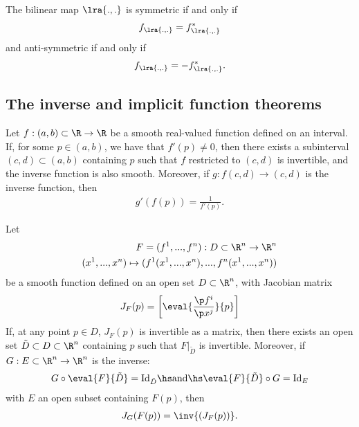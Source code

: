 \documentclass{article}
\begin{document}
\begin{lemma}
    The bilinear map $\lra{.,.}$ is symmetric if and only if
    \begin{align*}
        f_{\lra{.,.}}=f_{\lra{.,.}}^*
    \end{align*}
    and anti-symmetric if and only if
    \begin{align*}
        f_{\lra{.,.}}=-f_{\lra{.,.}}^*.
    \end{align*}
\end{lemma}


\subsection{The inverse and implicit function theorems}

\begin{theorem}
    Let $f:(a,b)\subset \R \to \R$ be a smooth real-valued function defined on an
    interval. If, for some $p\in(a,b)$, we have that $f'(p)\not=0$, then there exists
    a subinterval $(c,d)\subset(a,b)$ containing $p$ such that $f$ restricted to $(c,d)$
    is invertible, and the inverse function is also smooth. Moreover, if
    $g:f(c,d)\to(c,d)$ is the inverse function, then
    \begin{align*}
        g'(f(p))=\frac{1}{f'(p)}.
    \end{align*}
\end{theorem}

\begin{theorem}
    Let
    \begin{align*}
        F = (f^1,...,f^n):D\subset \R^n\to\R^n \\
        (x^1,...,x^n)\mapsto (f^1(x^1,...,x^n), ..., f^n(x^1,...,x^n))
    \end{align*}
    be a smooth function defined on an open set $D\subset\R^n$, with Jacobian matrix
    \begin{align*}
        J_F(p)=\left[\eval{\frac{\p f^i}{\p x^j}}{p}\right]
    \end{align*}
    If, at any point $p\in D$, $J_F(p)$ is invertible as a matrix, then there exists
    an open set $\tilde D\subset D\subset \R^n$ containing $p$ such that $F|_{\tilde D}$
    is invertible.
    Moreover, if $G:E\subset\R^n\to \R^n$ is the inverse:
    \begin{align*}
        G\circ \eval{F}{\tilde D}=\text{Id}_{\tilde D} \hs\text{and}\hs \eval{F}{\tilde D}\circ G=\text{Id}_E
    \end{align*}
    with $E$ an open subset containing $F(p)$, then
    \begin{align*}
        J_G(F(p))=\inv{(J_F(p))}.
    \end{align*}
\end{theorem}
\end{document}
